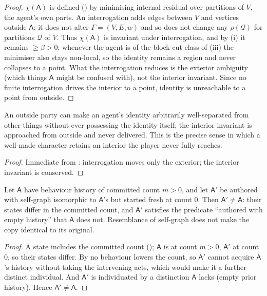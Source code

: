 \documentclass[11pt,twocolumn,a4paper]{article}
\newcommand{\Agent}{\mathsf{A}}
\newcommand{\Self}{\Gamma}          %
\newcommand{\V}{V}
\newcommand{\E}{E}
\newcommand{\wt}{w}
\newcommand{\floorc}{\beta}          %
\newcommand{\Char}{\chi}             %
\begin{document}
\begin{proof}
$\Char(\Agent)$ is defined () by minimising internal
residual over partitions of $\V$, the agent's own parts. An interrogation
adds edges between $\V$ and vertices outside $\Agent$; it does not alter
$\Self=(\V,\E,\wt)$ and so does not change any $\rho(\mathcal Q)$ for
partitions $\mathcal Q$ of $\V$. Thus $\Char(\Agent)$ is invariant under
interrogation, and by (i) it remains $\ge\floorc>0$;
whenever the agent is of the block-cut class of (iii)
the minimiser also stays non-local, so the identity remains a region and
never collapses to a point. What the interrogation reduces is
the exterior ambiguity (which things $\Agent$ might be confused with), not
the interior invariant. Since no finite interrogation drives the interior
to a point, identity is unreachable to a point from outside.
\end{proof}

\begin{corollary}
An outside party can make an agent's identity arbitrarily well-separated
from other things without ever possessing the identity itself; the
interior invariant is approached from outside and never delivered. This is
the precise sense in which a well-made character retains an interior the
player never fully reaches.
\end{corollary}

\begin{proof}
Immediate from : interrogation moves only the
exterior; the interior invariant is conserved.
\end{proof}

\begin{theorem}
\label{thm:copy}
Let $\Agent$ have behaviour history of committed count $m>0$, and let
$\Agent'$ be authored with self-graph isomorphic to $\Agent$'s but started
fresh at count $0$. Then $\Agent'\neq\Agent$: their states differ in the
committed count, and $\Agent'$ satisfies the predicate ``authored with
empty history'' that $\Agent$ does not. Resemblance of self-graph does not
make the copy identical to its original.
\end{theorem}

\begin{proof}
A state includes the committed count (); $\Agent$ is at
count $m>0$, $\Agent'$ at count $0$, so their states differ. By
 no behaviour lowers the count, so $\Agent'$ cannot
acquire $\Agent$'s history without taking the intervening acts, which
would make it a further-distinct individual. And $\Agent'$ is individuated
by a distinction $\Agent$ lacks (empty prior history). Hence
$\Agent'\neq\Agent$.
\end{proof}
\end{document}
